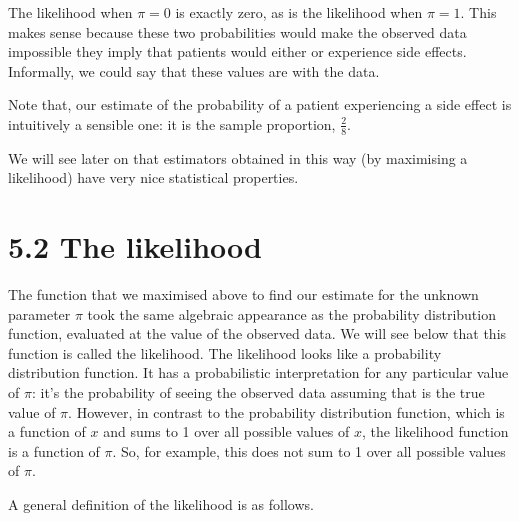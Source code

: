 \documentclass[letterpaper,10pt,english]{jupyterBook}
\begin{document}
\sphinxAtStartPar
The likelihood when \(\pi = 0\) is exactly zero, as is the likelihood when \(\pi = 1\). This makes sense because these two probabilities would make the observed data impossible \sphinxhyphen{} they imply that patients would either  or  experience side effects. Informally, we could say that these values are  with the data.

\sphinxAtStartPar
Note that, our estimate of the probability of a patient experiencing a side effect is intuitively a sensible one: it is the sample proportion, \(\frac{2}{8}\).

\sphinxAtStartPar
We will see later on that estimators obtained in this way (by maximising a likelihood) have very nice statistical properties.


\section{5.2 The likelihood}
\label{\detokenize{05.c. Likelihood:the-likelihood}}\label{\detokenize{05.c. Likelihood::doc}}
\sphinxAtStartPar
The function that we maximised above to find our estimate for the unknown parameter \(\pi\) took the same algebraic appearance as the probability distribution function, evaluated at the value of the observed data. We will see below that this function is called the likelihood. The likelihood looks like a probability distribution function. It has a probabilistic interpretation for any particular value of \(\pi\): it’s the probability of seeing the observed data assuming that is the true value of \(\pi\). However, in contrast to the probability distribution function, which is a function of \(x\) and sums to 1 over all possible values of \(x\), the likelihood function is a function of \(\pi\). So, for example, this does not sum to 1 over all possible values of \(\pi\).

\sphinxAtStartPar
A general definition of the likelihood is as follows.
\end{document}
